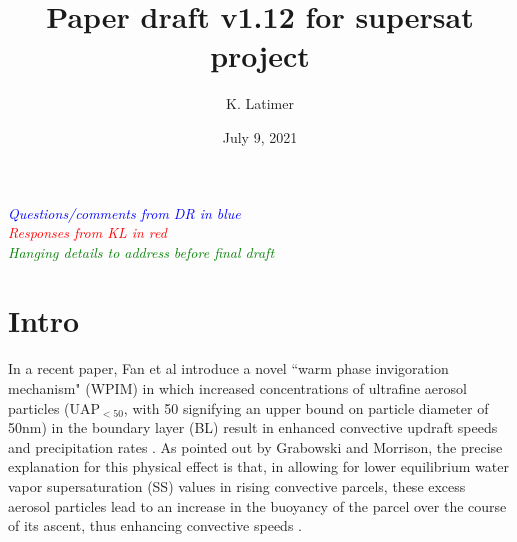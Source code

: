 \documentclass{article}
\title{Paper draft v1.12 for supersat project}
\author{K. Latimer}
\date{July 9, 2021}
\newcommand{\drcomm}[1]{\textcolor{blue}{\textit{#1}}}
\newcommand{\klcomm}[1]{\textcolor{red}{\textit{#1}}}
\newcommand{\todo}[1]{\textcolor{green}{\textit{#1}}}
\begin{document}
\maketitle

\noindent\drcomm{Questions/comments from DR in blue} \\
\noindent\klcomm{Responses from KL in red}\\
\noindent\todo{Hanging details to address before final draft}\\

\section{Intro}

In a recent paper, Fan et al introduce a novel ``warm phase invigoration mechanism" (WPIM) in which increased concentrations of ultrafine aerosol particles (UAP$_{<50}$, with 50 signifying an upper bound on particle diameter of 50nm) in the boundary layer (BL) result in enhanced convective updraft speeds and precipitation rates \cite{Fan2018}. As pointed out by Grabowski and Morrison, the precise explanation for this physical effect is that, in allowing for lower equilibrium water vapor supersaturation (SS) values in rising convective parcels, these excess aerosol particles lead to an increase in the buoyancy of the parcel over the course of its ascent, thus enhancing convective speeds \cite{Grabowski2020}.
\end{document}
